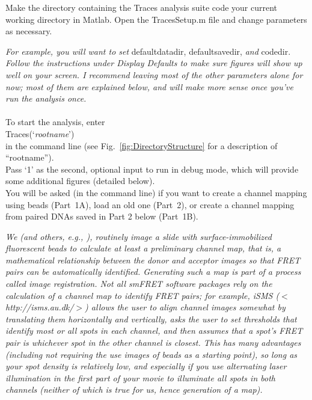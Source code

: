 \documentclass[11pt]{article}
\newcommand{\sj}[1]{\textcolor{red}{#1}}
\begin{document}
Make the directory containing the Traces analysis suite code your current working directory in Matlab. Open the TracesSetup.m file and change parameters as necessary. 

{\it For example, you will want to set } defaultdatadir, defaultsavedir, {\it and} codedir. {\it Follow the instructions under Display Defaults to make sure figures will show up well on your screen.  I recommend leaving most of the other parameters alone for now; most of them are explained below, and will make more sense once you've run the analysis once.}\\
\\
To start the analysis, enter\\

\noindent Traces(`{\it rootname}')\\

\noindent in the command line (see Fig.~\ref{fig:DirectoryStructure} for a description of ``rootname'').  \\


\noindent Pass `1' as the second, optional input to run in debug mode, which will provide some additional figures (detailed below).\\

\noindent You will be asked (in the command line) if you want to create a channel mapping using beads (Part~1A), load an old one (Part~2), or create a channel mapping from paired DNAs saved in Part 2 below (Part~1B). 

{\it We (and others, e.g., \cite{Deindl2012}), routinely image a slide with surface-immobilized fluorescent beads to calculate at least a preliminary channel map, that is, a mathematical relationship between the donor and acceptor images so that FRET pairs can be automatically identified. Generating such a map is part of a process called image registration. Not all smFRET software packages rely on the calculation of a channel map to identify FRET pairs; for example, iSMS ($<$http://isms.au.dk/$>$) allows the user to align channel images somewhat by translating them horizontally and vertically, asks the user to set thresholds that identify most or all spots in each channel, and then assumes that a spot's FRET pair is whichever spot in the other channel is closest. This has many advantages (including not requiring the use images of beads as a starting point), so long as your spot density is relatively low, and especially if you use alternating laser illumination in the first part of your movie to illuminate all spots in both channels (neither of which is true for us, hence generation of a map).}
\end{document}
